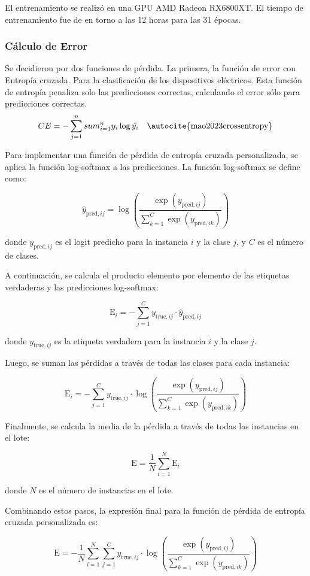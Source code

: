 El entrenamiento se realizó en una GPU AMD Radeon RX6800XT. El tiempo de entrenamiento fue de en torno a las 12 horas para las 31 épocas.

\subsubsection{Cálculo de Error}
Se decidieron por dos funciones de pérdida. La primera, la función de error con Entropía cruzada. Para la clasificación de los dispositivos eléctricos. Esta función de entropía penaliza solo las predicciones correctas, calculando el error sólo para predicciones correctas.
$$
CE=-\sum_{j=1}^{n}sum_{i=1}^{n} y_{i}\log{\hat{y_{i}}} \quad \text{\autocite{mao2023crossentropy}}
$$

Para implementar una función de pérdida de entropía cruzada personalizada, se aplica la función log-softmax a las predicciones. La función log-softmax se define como:

\[
\hat{y}_{\text{pred},ij} = \log \left( \frac{\exp(y_{\text{pred},ij})}{\sum_{k=1}^{C} \exp(y_{\text{pred},ik})} \right)
\]

donde \( y_{\text{pred},ij} \) es el logit predicho para la instancia \( i \) y la clase \( j \), y \( C \) es el número de clases.

A continuación, se calcula el producto elemento por elemento de las etiquetas verdaderas y las predicciones log-softmax:

\[
\text{E}_i = -\sum_{j=1}^{C} y_{\text{true},ij} \cdot \hat{y}_{\text{pred},ij}
\]

donde \( y_{\text{true},ij} \) es la etiqueta verdadera para la instancia \( i \) y la clase \( j \).

Luego, se suman las pérdidas a través de todas las clases para cada instancia:

\[
\text{E}_i = -\sum_{j=1}^{C} y_{\text{true},ij} \cdot \log \left( \frac{\exp(y_{\text{pred},ij})}{\sum_{k=1}^{C} \exp(y_{\text{pred},ik})} \right)
\]

Finalmente, se calcula la media de la pérdida a través de todas las instancias en el lote:

\[
\text{E} = \frac{1}{N} \sum_{i=1}^{N} \text{E}_i
\]

donde \( N \) es el número de instancias en el lote.

Combinando estos pasos, la expresión final para la función de pérdida de entropía cruzada personalizada es:

\[
\text{E} = -\frac{1}{N} \sum_{i=1}^{N} \sum_{j=1}^{C} y_{\text{true},ij} \cdot \log \left( \frac{\exp(y_{\text{pred},ij})}{\sum_{k=1}^{C} \exp(y_{\text{pred},ik})} \right)
\]

